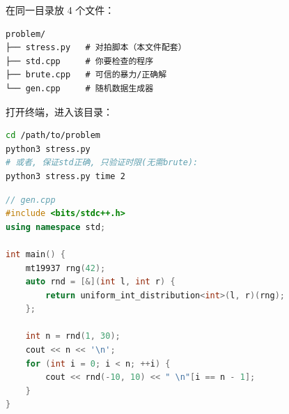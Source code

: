 在同一目录放 4 个文件：

\begin{lstlisting}
problem/
├── stress.py   # 对拍脚本（本文件配套）
├── std.cpp     # 你要检查的程序
├── brute.cpp   # 可信的暴力/正确解
└── gen.cpp     # 随机数据生成器
\end{lstlisting}

打开终端，进入该目录：

\begin{lstlisting}[language=bash]
cd /path/to/problem
python3 stress.py
# 或者, 保证std正确, 只验证时限(无需brute):
python3 stress.py time 2
\end{lstlisting}

\begin{lstlisting}[language={C++}]
// gen.cpp
#include <bits/stdc++.h>
using namespace std;

int main() {
    mt19937 rng(42);
    auto rnd = [&](int l, int r) {
        return uniform_int_distribution<int>(l, r)(rng);
    };

    int n = rnd(1, 30);
    cout << n << '\n';
    for (int i = 0; i < n; ++i) {
        cout << rnd(-10, 10) << " \n"[i == n - 1];
    }
}
\end{lstlisting}
